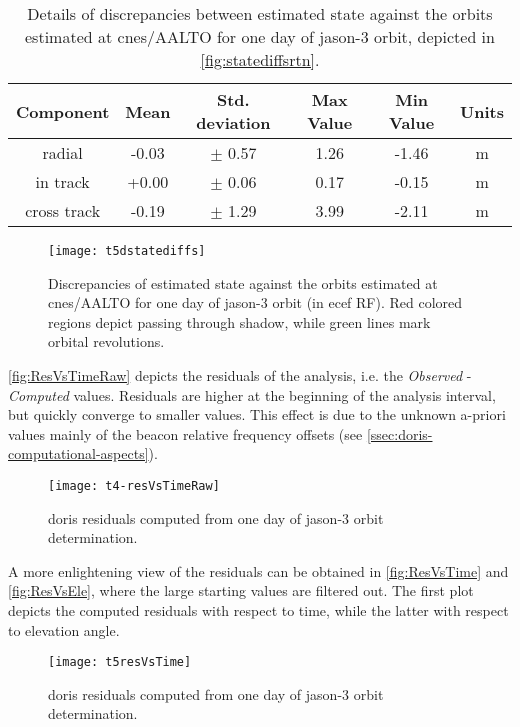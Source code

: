 \begin{table}[h!]
    \centering
    \begin{tabularx}{\textwidth}{cccccc}
        \toprule
        \textbf{Component} & \textbf{Mean} & \textbf{Std. deviation} & \textbf{Max Value} & \textbf{Min Value} & \textbf{Units}\\
        \hline
        radial &  -0.03 & $\pm$ 0.57 & 1.26 & -1.46 & \si{\metre}\\
        in track &  +0.00 & $\pm$ 0.06 & 0.17 & -0.15 & \si{\metre}\\
        cross track &  -0.19 & $\pm$ 1.29 & 3.99 & -2.11 & \si{\metre}\\
       \bottomrule
    \end{tabularx}
    \caption{Details of discrepancies between estimated state against the orbits estimated at \gls{cnes}/AALTO for one day of \gls{jason}-3 orbit, depicted in \autoref{fig:statediffsrtn}.}
    \label{table:statediffsrtn}
\end{table}

\begin{figure}[ht]
    \centering
    \texttt{[image: t5dstatediffs]}
    \caption{Discrepancies of estimated state against the orbits estimated at \gls{cnes}/AALTO for one day of \gls{jason}-3 orbit (in \gls{ecef} RF). Red colored regions depict passing through shadow, while green lines mark orbital revolutions.}
    \label{fig:statediffs-details}
\end{figure}

\autoref{fig:ResVsTimeRaw} depicts the residuals of the analysis, i.e. the \emph{Observed} 
- \emph{Computed} values. Residuals are higher at the beginning of the analysis interval, but 
quickly converge to smaller values. This effect is due to the unknown a-priori values mainly of 
the beacon relative frequency offsets (see \autoref{ssec:doris-computational-aspects}). 
\begin{figure}[ht]
    \centering
    \texttt{[image: t4-resVsTimeRaw]}
    \caption{\gls{doris} residuals computed from one day of \gls{jason}-3 orbit determination.}
    \label{fig:ResVsTimeRaw}
\end{figure}

A more enlightening view of the residuals can be obtained in \autoref{fig:ResVsTime} and 
\autoref{fig:ResVsEle}, where the large starting values are filtered out. The first 
plot depicts the computed residuals with respect to time, while the latter with respect to 
elevation angle. 
\begin{figure}[ht]
    \centering
    \texttt{[image: t5resVsTime]}
    \caption{\gls{doris} residuals computed from one day of \gls{jason}-3 orbit determination.}
    \label{fig:ResVsTime}
\end{figure}

